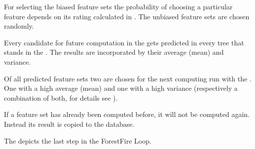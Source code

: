 \documentclass[letterpaper,10pt,english]{sphinxmanual}
\begin{document}
For selecting the biased feature sets the probability of choosing a particular feature depends on its rating calculated in {\hyperref[\detokenize{RF:buildforest}]{}}.
The unbiased feature sets are chosen randomly.

Every candidate for future computation in the {\hyperref[\detokenize{Overview:mla}]{}} gets predicted in every tree that stands in the {\hyperref[\detokenize{Overview:term-random-forest}]{}}. The results are incorporated by their average (mean) and variance.

Of all predicted feature sets two are chosen for the next computing run with the {\hyperref[\detokenize{Overview:mla}]{}}. One with a high average (mean) and one with a high variance (respectively a combination of both, for details see {\hyperref[\detokenize{RF:forest-predict}]{}}).

If a feature set has already been computed before, it will not be computed again.
Instead its result is copied to the database.

The {\hyperref[\detokenize{Update_Database:update-database}]{}} depicts the last step in the ForestFire Loop.
\end{document}
